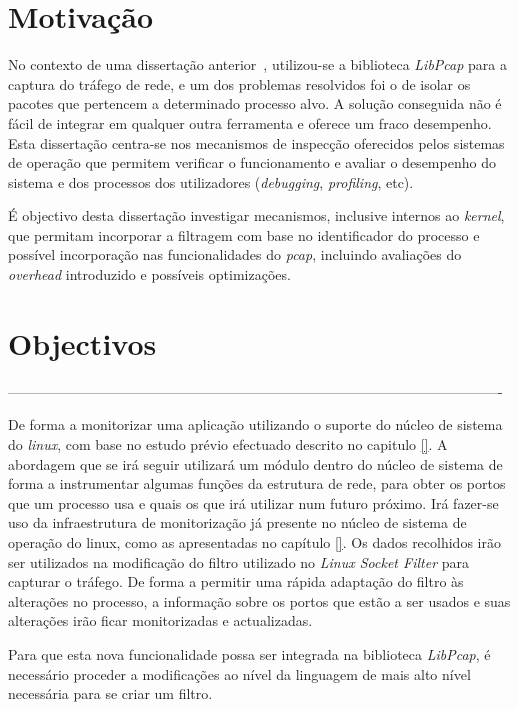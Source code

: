 \section{Motivação}
\label{sub:intro_motivation}

No contexto de uma dissertação anterior~\cite{Farruca:2009}, utilizou-se a biblioteca \textit{LibPcap} para a captura do tráfego de rede, e um dos problemas resolvidos foi o de isolar os pacotes que pertencem a determinado processo alvo.
A solução conseguida não é fácil de integrar em qualquer outra ferramenta e oferece um fraco desempenho.
Esta dissertação centra-se nos mecanismos de inspecção oferecidos pelos sistemas de operação que permitem verificar o funcionamento e avaliar o desempenho do sistema e dos processos dos utilizadores (\textit{debugging}, \textit{profiling}, etc).

É objectivo desta dissertação investigar mecanismos, inclusive internos ao \textit{kernel}, que permitam incorporar a filtragem com base no identificador do processo e possível incorporação nas funcionalidades do \textit{pcap}, incluindo avaliações do \textit{overhead} introduzido e possíveis optimizações.

\section{Objectivos}
\label{sec:intro_goals}

----------------------------------------------------------------------------------------------------------

De forma a monitorizar uma aplicação utilizando o suporte do núcleo de sistema do \textit{linux}, com base no estudo prévio efectuado descrito no capitulo \ref{}.
A abordagem que se irá seguir utilizará um módulo dentro do núcleo de sistema de forma a instrumentar algumas funções da estrutura de rede, para obter os portos que um processo usa e quais os que irá utilizar num futuro próximo.
Irá fazer-se uso da infraestrutura de monitorização já presente no núcleo de sistema de operação do linux, como as apresentadas no capítulo \ref{}.
Os dados recolhidos irão ser utilizados na modificação do filtro utilizado no \textit{Linux Socket Filter} para capturar o tráfego.
De forma a permitir uma rápida adaptação do filtro às alterações no processo, a informação sobre os portos que estão a ser usados e suas alterações irão ficar monitorizadas e actualizadas.

Para que esta nova funcionalidade possa ser integrada na biblioteca \textit{LibPcap}, é necessário proceder a modificações ao nível da linguagem de mais alto nível necessária para se criar um filtro.



